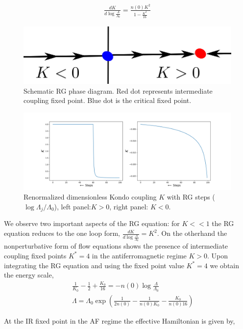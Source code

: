 \documentclass[aps,prx,preprint,groupedaddress]{revtex4-2}
\begin{document}
\begin{eqnarray}
\frac{d K}{d\log\frac{\Lambda}{\Lambda_{0}}}=\frac{n(0)K^{2}}{1-\frac{K^{2}}{16}}
\end{eqnarray}
\begin{figure}[h!]
\centering
\includegraphics[scale=0.6]{Kondo.png}
\caption{Schematic RG phase diagram. Red dot represents intermediate coupling fixed point. Blue dot is the critical fixed point.} 
\end{figure}
\begin{figure}
\centering
\includegraphics[width=\textwidth]{RG_Flow.png}
\caption{Renormalized dimensionless Kondo coupling $K$ with RG steps ($\log\Lambda_{j}/\Lambda_{0}$), left panel:$K>0$, right panel: $K<0$.} 
\end{figure}
We observe two important aspects of the RG equation: for $K<<1$ the RG equation reduces to the one loop form, $\frac{d K}{d\log\frac{\Lambda}{\Lambda_{0}}}=K^{2}$\cite{anderson1970poor}. On the otherhand the nonperturbative form of flow equations shows the presence of intermediate coupling fixed points $K^{*}=4$ in the antiferromagnetic regime $K>0$.
Upon integrating the RG equation and using the fixed point value $K^{*}=4$ we obtain the energy scale,
\begin{eqnarray}
&&\frac{1}{K_{0}}-\frac{1}{2}+\frac{K_{0}}{16}=-n(0)\log\frac{\Lambda}{\Lambda_{0}}\nonumber\\
&&\Lambda=\Lambda_{0}\exp\left(\frac{1}{2n(0)}-\frac{1}{n(0)K_{0}}-\frac{K_{0}}{n(0)16}\right)\label{gap function}
\end{eqnarray}
\par\noindent
At the IR fixed point in the AF regime the effective Hamiltonian is given by,
\end{document}

